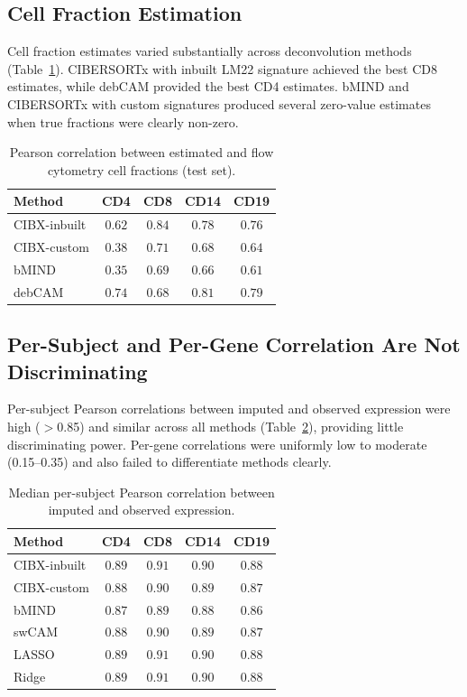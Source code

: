\documentclass[11pt]{article}
\begin{document}
\subsection{Cell Fraction Estimation}

Cell fraction estimates varied substantially across deconvolution methods (Table~\ref{tab:fractions}). CIBERSORTx with inbuilt LM22 signature achieved the best CD8 estimates, while debCAM provided the best CD4 estimates. bMIND and CIBERSORTx with custom signatures produced several zero-value estimates when true fractions were clearly non-zero.

\begin{table}[H]
\centering
\caption{Pearson correlation between estimated and flow cytometry cell fractions (test set).}
\label{tab:fractions}
\begin{tabular}{lcccc}
\toprule
\textbf{Method} & \textbf{CD4} & \textbf{CD8} & \textbf{CD14} & \textbf{CD19} \\
\midrule
CIBX-inbuilt & $0.62$ & $\mathbf{0.84}$ & $0.78$ & $0.76$ \\
CIBX-custom & $0.38$ & $0.71$ & $0.68$ & $0.64$ \\
bMIND & $0.35$ & $0.69$ & $0.66$ & $0.61$ \\
debCAM & $\mathbf{0.74}$ & $0.68$ & $\mathbf{0.81}$ & $\mathbf{0.79}$ \\
\bottomrule
\end{tabular}
\end{table}

\subsection{Per-Subject and Per-Gene Correlation Are Not Discriminating}

Per-subject Pearson correlations between imputed and observed expression were high ($>$0.85) and similar across all methods (Table~\ref{tab:corr_subject}), providing little discriminating power. Per-gene correlations were uniformly low to moderate (0.15--0.35) and also failed to differentiate methods clearly.

\begin{table}[H]
\centering
\caption{Median per-subject Pearson correlation between imputed and observed expression.}
\label{tab:corr_subject}
\begin{tabular}{lcccc}
\toprule
\textbf{Method} & \textbf{CD4} & \textbf{CD8} & \textbf{CD14} & \textbf{CD19} \\
\midrule
CIBX-inbuilt & $0.89$ & $0.91$ & $0.90$ & $0.88$ \\
CIBX-custom & $0.88$ & $0.90$ & $0.89$ & $0.87$ \\
bMIND & $0.87$ & $0.89$ & $0.88$ & $0.86$ \\
swCAM & $0.88$ & $0.90$ & $0.89$ & $0.87$ \\
LASSO & $0.89$ & $0.91$ & $0.90$ & $0.88$ \\
Ridge & $0.89$ & $0.91$ & $0.90$ & $0.88$ \\
\bottomrule
\end{tabular}
\end{table}
\end{document}
